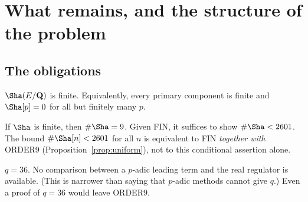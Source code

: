 \section{What remains, and the structure of the problem}\label{sec:remaining}

\subsection{The obligations}
\begin{obligation}
$\Sha(E/\Q)$ is finite. Equivalently, every primary component is finite and $\Sha[p]=0$ for all but finitely many $p$.
\end{obligation}
\begin{obligation}
If $\Sha$ is finite, then $\#\Sha=9$. Given FIN, it suffices to show $\#\Sha<2601$. The bound $\#\Sha[n]<2601$ for all $n$ is equivalent to FIN \emph{together with} ORDER9 (Proposition~\ref{prop:uniform}), not to this conditional assertion alone.
\end{obligation}
\begin{obligation}[\cid{O.3}, Q36]
$q=36$. No comparison between a $p$-adic leading term and the real regulator is available. (This is narrower than saying that $p$-adic methods cannot give $q$.) Even a proof of $q=36$ would leave ORDER9.
\end{obligation}

